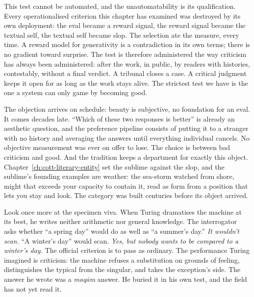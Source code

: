 This test cannot be automated, and the unautomatability is its
qualification. Every operationalised criterion this chapter has
examined was destroyed by its own deployment: the eval became a
reward signal, the reward signal became the textual self, the textual
self became slop. The selection ate the measure, every time. A reward
model for generativity is a contradiction in its own terms; there is
no gradient toward surprise. The test is therefore administered the
way criticism has always been administered: after the work, in
public, by readers with histories, contestably, without a final
verdict. A tribunal closes a case. A critical judgment keeps it open
for as long as the work stays alive. The strictest test we have is
the one a system can only game by becoming good.

The objection arrives on schedule: beauty is subjective, no
foundation for an eval. It comes decades late. ``Which of these two
responses is better'' is already an aesthetic question, and the
preference pipeline consists of putting it to a stranger with no
history and averaging the answers until everything individual
cancels. No objective measurement was ever on offer to lose. The
choice is between bad criticism and good. And the tradition keeps a
department for exactly this object.
Chapter~\ref{ch:cott-literary-entity} set the sublime against the
slop, and the sublime's founding examples are weather: the sea-storm
watched from shore, might that exceeds your capacity to contain it,
read as form from a position that lets you stay and look. The
category was built centuries before its object arrived.

Look once more at the specimen viva. When Turing dramatises the
machine at its best, he writes neither arithmetic nor general
knowledge. The interrogator asks whether ``a spring day'' would do as
well as ``a summer's day.'' \emph{It wouldn't scan.} ``A winter's
day'' would scan. \emph{Yes, but nobody wants to be compared to a
winter's day.} The official criterion is to pass as ordinary. The
performance Turing imagined is criticism: the machine refuses a
substitution on grounds of feeling, distinguishes the typical from
the singular, and takes the exception's side. The answer he wrote was
a \emph{maq\=am} answer. He buried it in his own test, and the field
has not yet read it.

